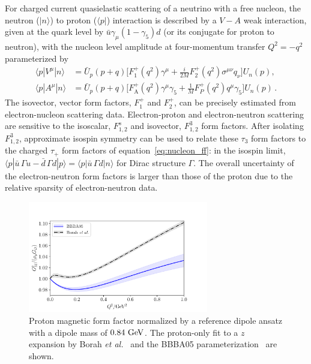 For charged current quasielastic scattering of a neutrino with a free nucleon,
the neutron ($|n\rangle$) to proton ($\langle p|$)
interaction is described by a $V-A$ weak interaction, given at the quark level by
$\bar{u}\gamma_\mu(1- \gamma_5)d$ (or its conjugate for proton to neutron), with the nucleon level amplitude at four-momentum transfer $Q^2 = -q^2$ parameterized by
\begin{align}\label{eq:nucleon_ff}
\langle p | V^\mu | n \rangle
    &= \bar{U}_p(p+q) \Big[
        F_1^+(q^2) \gamma^\mu
        +\frac{i}{2M} F_2^+(q^2) \sigma^{\mu\nu} q_\nu
    \Big] U_n(p),
\nonumber\\
\langle p | A^\mu | n \rangle
    &= \bar{U}_p(p+q) \Big[
        F_{\mathrm{A}}^+(q^2) \gamma^\mu \gamma_5
        +\frac{1}{M} F_P^+(q^2) q^\mu \gamma_5
    \Big] U_n(p)\, .
\end{align}
The isovector, vector form factors, $F_1^+$ and $F_2^+$, can be precisely estimated from electron-nucleon scattering data.
Electron-proton and electron-neutron scattering are sensitive to the isoscalar, $F_{1,2}^s$ and isovector, $F_{1,2}^3$ form factors.  After isolating $F_{1,2}^3$, approximate isospin symmetry can be used to relate these $\tau_3$ form factors to the charged $\tau_+$ form factors of equation~\eqref{eq:nucleon_ff}: in the isospin limit, $\langle p| \bar{u}\, \Gamma u - \bar{d}\, \Gamma d |p\rangle = \langle p| \bar{u}\, \Gamma d |n\rangle$
  for Dirac structure $\Gamma$.
The overall uncertainty of the electron-neutron form factors is larger than those of the proton due to the relative sparsity of electron-neutron data.
\begin{figure}
 \centering
 \includegraphics[width=0.7\textwidth]{plots/proton_magnetic-standalone.pdf}
 \vspace{4pt}
\caption{
Proton magnetic form factor normalized by a reference dipole ansatz
with a dipole mass of $0.84~{\rm GeV}$.
The proton-only fit to a $z$ expansion by Borah {\it et al.}~\cite{Borah:2020gte}
and the BBBA05 parameterization~\cite{Bradford:2006yz} are shown.
\label{fig:protonmagneticff}
}
\end{figure}

